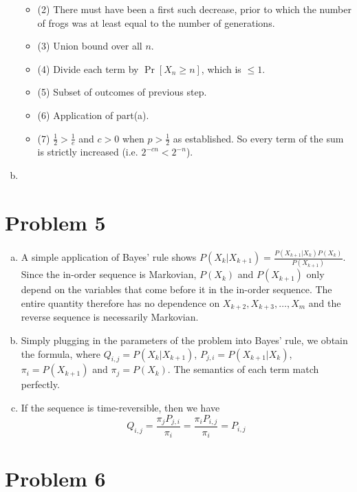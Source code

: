 \documentclass[11pt]{article}
\begin{document}
\begin{enumerate}[(a)]
\begin{itemize}
\item (2) There must have been a first such decrease, prior to which the number of frogs was at least equal to the number of generations.
\item (3) Union bound over all $n$.
\item (4) Divide each term by $\Pr[X_n\geq n]$, which is $\leq 1$.
\item (5) Subset of outcomes of previous step.
\item (6) Application of part(a).
\item (7) $\frac12>\frac1e$ and $c>0$ when $p>\frac12$ as established. So every term of the sum is strictly increased (i.e. $2^{-cn}<2^{-n}$).
\end{itemize}
\item 
\end{enumerate}


\newpage
\section*{Problem 5}
\begin{enumerate}[(a)]
\item A simple application of Bayes' rule shows $P(X_k|X_{k+1})=\frac{P(X_{k+1}|X_k)P(X_k)}{P(X_{k+1})}$. Since the in-order sequence is Markovian, $P(X_k)$ and $P(X_{k+1})$ only depend on the variables that come before it in the in-order sequence. The entire quantity therefore has no dependence on $X_{k+2},X_{k+3},\ldots,X_m$ and the reverse sequence is necessarily Markovian.
\item Simply plugging in the parameters of the problem into Bayes' rule, we obtain the formula, where $Q_{i,j}=P(X_k|X_{k+1})$, $P_{j,i}=P(X_{k+1}|X_k)$, $\pi_i=P(X_{k+1})$ and $\pi_j=P(X_k)$. The semantics of each term match perfectly.
\item If the sequence is time-reversible, then we have
$$Q_{i,j}=\frac{\pi_jP_{j,i}}{\pi_i}=\frac{\pi_iP_{i,j}}{\pi_i}=P_{i,j}$$
\end{enumerate}


\newpage
\section*{Problem 6}
\end{document}
